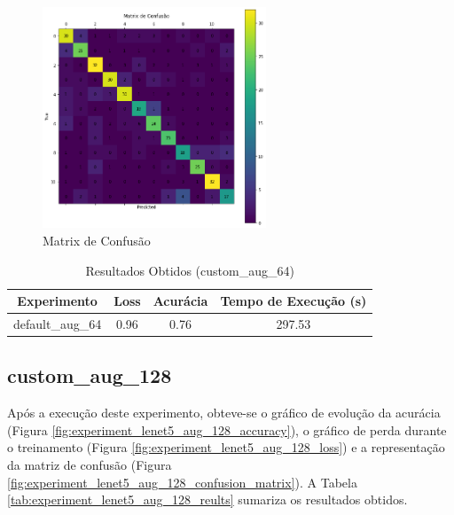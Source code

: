 \documentclass[12pt]{article}
\begin{document}
\begin{figure}[!htb]
  \centering
  \includegraphics[width=18em]{experiments/default_aug_64/confusion_matrix.png}
  \caption{Matrix de Confusão}
  \label{fig:experiment_default_aug_64_confusion_matrix}
\end{figure}

\begin{table}[!htb]
  \centering
  \begin{tabular}{|c|c|c|c|}
    \hline
    \textbf{Experimento} & \textbf{Loss} & \textbf{Acurácia} & \textbf{Tempo de Execução (s)} \\ \hline
    default\_aug\_64     & 0.96          & 0.76              & 297.53                         \\ \hline
  \end{tabular}
  \caption{Resultados Obtidos (custom\_aug\_64)}
  \label{tab:experiment_default_aug_64_reults}
\end{table}

\newpage

\subsection{custom\_aug\_128}

Após a execução deste experimento, obteve-se o gráfico de evolução da acurácia (Figura \ref{fig:experiment_lenet5_aug_128_accuracy}), o gráfico de perda durante o treinamento (Figura \ref{fig:experiment_lenet5_aug_128_loss}) e a representação da matriz de confusão (Figura \ref{fig:experiment_lenet5_aug_128_confusion_matrix}). A Tabela \ref{tab:experiment_lenet5_aug_128_reults} sumariza os resultados obtidos.
\end{document}
